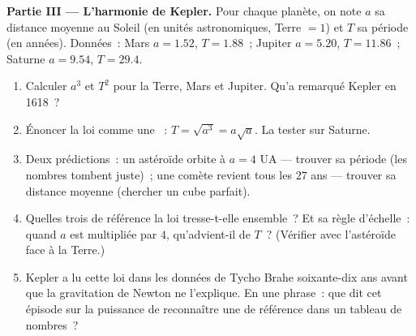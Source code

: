 \begin{problem}
\medskip
\noindent\textbf{Partie III --- L'harmonie de Kepler.}
Pour chaque planète, on note $a$ sa distance moyenne au Soleil (en
unités astronomiques, Terre $= 1$) et $T$ sa période (en années).
Données~: Mars $a = 1.52$, $T = 1.88$~; Jupiter $a = 5.20$,
$T = 11.86$~; Saturne $a = 9.54$, $T = 29.4$.
\begin{enumerate}[resume]
  \item Calculer $a^3$ et $T^2$ pour la Terre, Mars et Jupiter.
        Qu'a remarqué Kepler en 1618~?
  \item Énoncer la loi comme une ~: $T = \sqrt{a^3} =
        a\sqrt a$. La tester sur Saturne.
  \item Deux prédictions~: un astéroïde orbite à $a = 4$ UA ---
        trouver sa période (les nombres tombent juste)~; une comète
        revient tous les $27$ ans --- trouver sa distance moyenne
        (chercher un cube parfait).
  \item Quelles trois  de référence la loi tresse-t-elle
        ensemble~? Et sa règle d'échelle~: quand $a$ est multipliée
        par $4$, qu'advient-il de $T$~? (Vérifier avec l'astéroïde
        face à la Terre.)
  \item Kepler a lu cette loi dans les données de Tycho Brahe
        soixante-dix ans avant que la gravitation de Newton ne
        l'explique. En une phrase~: que dit cet épisode sur la
        puissance de reconnaître une  de référence dans un
        tableau de nombres~?
\end{enumerate}


\end{problem}
